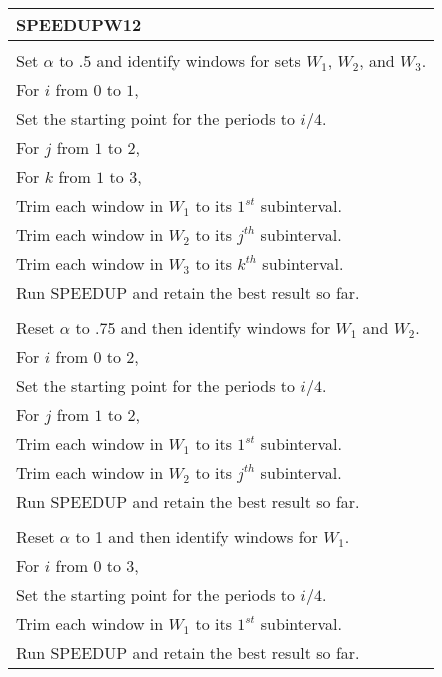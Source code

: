 \documentclass[11pt]{article}
\newcommand{\tab}{\hspace{.25in}}
\begin{document}
\begin{table}[!htb]
\begin{tabular}{l}
\toprule
\textbf{SPEEDUPW12}\\
\midrule
\tab {\it PHASE 1:}\\
\tab Set $\alpha$ to .5 and identify windows for sets $W_1$, $W_2$, and $W_3$.\\
\tab For $i$ from $0$ to $1$,\\
\tab \tab Set the starting point for the periods to $i/4$.\\
\tab \tab For $j$ from $1$ to 2,\\
\tab \tab \tab For $k$ from $1$ to 3,\\
\tab \tab \tab \tab Trim each window in $W_1$ to its $1^{st}$ subinterval.\\
\tab \tab \tab \tab Trim each window in $W_2$ to its $j^{th}$ subinterval.\\
\tab \tab \tab \tab Trim each window in $W_3$ to its $k^{th}$ subinterval.\\
\tab \tab \tab \tab Run SPEEDUP and retain the best result so far.\\
\tab {\it PHASE 2:}\\
\tab Reset $\alpha$ to .75 and then identify windows for $W_1$ and $W_2$.\\
\tab For $i$ from $0$ to $2$,\\
\tab \tab Set the starting point for the periods to $i/4$.\\
\tab \tab For $j$ from $1$ to 2,\\
\tab \tab \tab Trim each window in $W_1$ to its $1^{st}$ subinterval.\\
\tab \tab \tab Trim each window in $W_2$ to its $j^{th}$ subinterval.\\
\tab \tab \tab Run SPEEDUP and retain the best result so far.\\
\tab {\it PHASE 3:}\\
\tab Reset $\alpha$ to 1 and then identify windows for $W_1$.\\
\tab For $i$ from $0$ to $3$,\\
\tab \tab Set the starting point for the periods to $i/4$.\\
\tab \tab Trim each window in $W_1$ to its $1^{st}$ subinterval.\\
\tab \tab Run SPEEDUP and retain the best result so far.\\
\bottomrule
\end{tabular}
\end{table}
\end{document}
